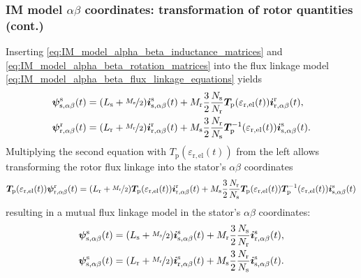 \begin{frame}
	\frametitle{IM model $\alpha\beta$ coordinates: transformation of rotor quantities (cont.)}
    Inserting \eqref{eq:IM_model_alpha_beta_inductance_matrices} and \eqref{eq:IM_model_alpha_beta_rotation_matrices} into the flux linkage model \eqref{eq:IM_model_alpha_beta_flux_linkage_equations} yields
    \begin{equation}
        \begin{split}
            \bm{\psi}^\mathrm{s}_\mathrm{s,\alpha\beta}(t) & = (L_\mathrm{s} +\nicefrac{M_\mathrm{s}}{2}) \bm{i}^\mathrm{s}_{\mathrm{s},\alpha\beta}(t) +  M_{\mathrm{r}}\frac{3}{2}\frac{N_\mathrm{s}}{N_\mathrm{r}} \bm{T}_\mathrm{p}(\varepsilon_\mathrm{r,el}(t))\bm{i}^\mathrm{r}_{\mathrm{r},\alpha\beta}(t),\\
            \bm{\psi}^\mathrm{r}_\mathrm{r,\alpha\beta}(t) & = (L_\mathrm{r} +\nicefrac{M_\mathrm{r}}{2}) \bm{i}^\mathrm{r}_{\mathrm{r},\alpha\beta}(t) +  M_{\mathrm{s}}\frac{3}{2}\frac{N_\mathrm{r}}{N_\mathrm{s}} \bm{T}_\mathrm{p}^{-1}(\varepsilon_\mathrm{r,el}(t))\bm{i}^\mathrm{s}_{\mathrm{s},\alpha\beta}(t).
        \end{split}
    \end{equation}
    Multiplying the second equation with $T_\mathrm{p}(\varepsilon_\mathrm{r,el}(t))$ from the left allows transforming the rotor flux linkage into the stator's $\alpha\beta$ coordinates
    \begin{equation*}
            \bm{T}_\mathrm{p}(\varepsilon_\mathrm{r,el}(t))\bm{\psi}^\mathrm{r}_\mathrm{r,\alpha\beta}(t)  = (L_\mathrm{r} +\nicefrac{M_\mathrm{r}}{2}) \bm{T}_\mathrm{p}(\varepsilon_\mathrm{r,el}(t))\bm{i}^\mathrm{r}_{\mathrm{r},\alpha\beta}(t) +  M_{\mathrm{s}}\frac{3}{2}\frac{N_\mathrm{r}}{N_\mathrm{s}} \bm{T}_\mathrm{p}(\varepsilon_\mathrm{r,el}(t))\bm{T}_\mathrm{p}^{-1}(\varepsilon_\mathrm{r,el}(t))\bm{i}^\mathrm{s}_{\mathrm{s},\alpha\beta}(t)
    \end{equation*}
    resulting in a mutual flux linkage model in the stator's $\alpha\beta$ coordinates:
    \begin{equation}
        \begin{split}
            \bm{\psi}^\mathrm{s}_\mathrm{s,\alpha\beta}(t) & = (L_\mathrm{s} +\nicefrac{M_\mathrm{s}}{2}) \bm{i}^\mathrm{s}_{\mathrm{s},\alpha\beta}(t) +  M_{\mathrm{r}}\frac{3}{2}\frac{N_\mathrm{s}}{N_\mathrm{r}} \bm{i}^\mathrm{s}_{\mathrm{r},\alpha\beta}(t),\\
            \bm{\psi}^\mathrm{s}_\mathrm{s,\alpha\beta}(t) & = (L_\mathrm{r} +\nicefrac{M_\mathrm{r}}{2}) \bm{i}^\mathrm{s}_{\mathrm{r},\alpha\beta}(t) +  M_{\mathrm{s}}\frac{3}{2}\frac{N_\mathrm{r}}{N_\mathrm{s}} \bm{i}^\mathrm{s}_{\mathrm{s},\alpha\beta}(t).
        \end{split}
        \label{eq:IM_model_alpha_beta_flux_linkage_equations_stator_oriented}
    \end{equation}
\end{frame}

